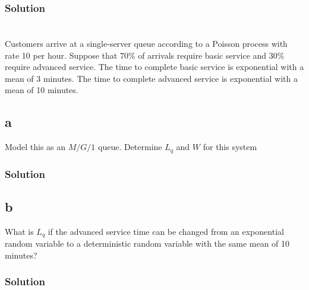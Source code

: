 \documentclass[letterpaper]{amsart}
\begin{document}
\subsubsection*{Solution}

\section{} %
Customers arrive at a single-server queue according to a Poisson process with rate
10 per hour. Suppose that 70\% of arrivals require basic service and 30\% require
advanced service. The time to complete basic service is exponential with a mean
of 3 minutes. The time to complete advanced service is exponential with a mean
of 10 minutes.
\subsection*{a}
Model this as an $M/G/1$ queue. Determine $L_q$ and $W$ for this system
\subsubsection*{Solution}
\subsection*{b}
What is $L_q$ if the advanced service time can be changed from an
exponential random variable to a deterministic random variable with the
same mean of 10 minutes?
\subsubsection*{Solution}
\end{document}
